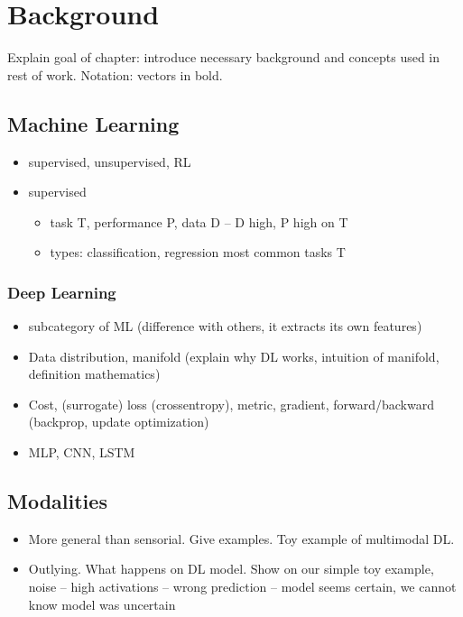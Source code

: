\chapter{Background} 
\label{chapter-2} 

Explain goal of chapter: introduce necessary background and concepts used in rest of work. Notation: vectors in bold.


\section{Machine Learning}
\begin{itemize}
\item supervised, unsupervised, RL
\item supervised
\begin{itemize}
	\item task T, performance P, data D -- D high, P high on T
	\item types: classification, regression most common tasks T
\end{itemize}
\end{itemize}

\subsection{Deep Learning}
\begin{itemize}
\item subcategory of ML (difference with others, it extracts its own features)
\item Data distribution, manifold (explain why DL works, intuition of manifold, definition mathematics)
\item Cost, (surrogate) loss (crossentropy), metric, gradient, forward/backward (backprop, update optimization)
\item MLP, CNN, LSTM
\end{itemize}


\section{Modalities}
\begin{itemize}
\item More general than sensorial. Give examples. Toy example of multimodal DL.
\item Outlying. What happens on DL model. Show on our simple toy example, noise -- high activations -- wrong prediction -- model seems certain, we cannot know model was uncertain
\end{itemize}

